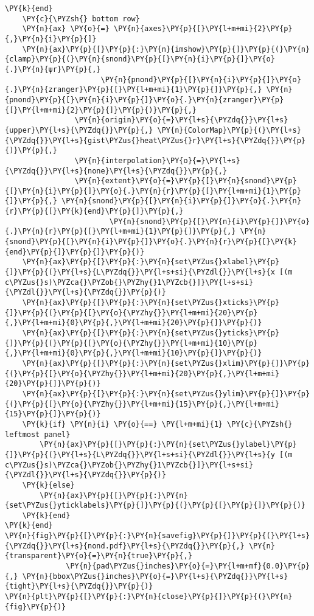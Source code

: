 \begin{Verbatim}[commandchars=\\\{\}]
    \PY{k}{end}
    \PY{c}{\PYZsh{} bottom row}
    \PY{n}{ax} \PY{o}{=} \PY{n}{axes}\PY{p}{[}\PY{l+m+mi}{2}\PY{p}{,}\PY{n}{i}\PY{p}{]}
    \PY{n}{ax}\PY{p}{[}\PY{p}{:}\PY{n}{imshow}\PY{p}{]}\PY{p}{(}\PY{n}{clamp}\PY{p}{(}\PY{n}{snond}\PY{p}{[}\PY{n}{i}\PY{p}{]}\PY{o}{.}\PY{n}{ψr}\PY{p}{,}
                      \PY{n}{pnond}\PY{p}{[}\PY{n}{i}\PY{p}{]}\PY{o}{.}\PY{n}{zranger}\PY{p}{[}\PY{l+m+mi}{1}\PY{p}{]}\PY{p}{,} \PY{n}{pnond}\PY{p}{[}\PY{n}{i}\PY{p}{]}\PY{o}{.}\PY{n}{zranger}\PY{p}{[}\PY{l+m+mi}{2}\PY{p}{]}\PY{p}{)}\PY{p}{,}
                \PY{n}{origin}\PY{o}{=}\PY{l+s}{\PYZdq{}}\PY{l+s}{upper}\PY{l+s}{\PYZdq{}}\PY{p}{,} \PY{n}{ColorMap}\PY{p}{(}\PY{l+s}{\PYZdq{}}\PY{l+s}{gist\PYZus{}heat\PYZus{}r}\PY{l+s}{\PYZdq{}}\PY{p}{)}\PY{p}{,}
                \PY{n}{interpolation}\PY{o}{=}\PY{l+s}{\PYZdq{}}\PY{l+s}{none}\PY{l+s}{\PYZdq{}}\PY{p}{,}
                \PY{n}{extent}\PY{o}{=}\PY{p}{[}\PY{n}{snond}\PY{p}{[}\PY{n}{i}\PY{p}{]}\PY{o}{.}\PY{n}{r}\PY{p}{[}\PY{l+m+mi}{1}\PY{p}{]}\PY{p}{,} \PY{n}{snond}\PY{p}{[}\PY{n}{i}\PY{p}{]}\PY{o}{.}\PY{n}{r}\PY{p}{[}\PY{k}{end}\PY{p}{]}\PY{p}{,}
                        \PY{n}{snond}\PY{p}{[}\PY{n}{i}\PY{p}{]}\PY{o}{.}\PY{n}{r}\PY{p}{[}\PY{l+m+mi}{1}\PY{p}{]}\PY{p}{,} \PY{n}{snond}\PY{p}{[}\PY{n}{i}\PY{p}{]}\PY{o}{.}\PY{n}{r}\PY{p}{[}\PY{k}{end}\PY{p}{]}\PY{p}{]}\PY{p}{)}
    \PY{n}{ax}\PY{p}{[}\PY{p}{:}\PY{n}{set\PYZus{}xlabel}\PY{p}{]}\PY{p}{(}\PY{l+s}{L\PYZdq{}}\PY{l+s+si}{\PYZdl{}}\PY{l+s}{x [(m c\PYZus{}s)\PYZca{}\PYZob{}\PYZhy{}1\PYZcb{}]}\PY{l+s+si}{\PYZdl{}}\PY{l+s}{\PYZdq{}}\PY{p}{)}
    \PY{n}{ax}\PY{p}{[}\PY{p}{:}\PY{n}{set\PYZus{}xticks}\PY{p}{]}\PY{p}{(}\PY{p}{[}\PY{o}{\PYZhy{}}\PY{l+m+mi}{20}\PY{p}{,}\PY{l+m+mi}{0}\PY{p}{,}\PY{l+m+mi}{20}\PY{p}{]}\PY{p}{)}
    \PY{n}{ax}\PY{p}{[}\PY{p}{:}\PY{n}{set\PYZus{}yticks}\PY{p}{]}\PY{p}{(}\PY{p}{[}\PY{o}{\PYZhy{}}\PY{l+m+mi}{10}\PY{p}{,}\PY{l+m+mi}{0}\PY{p}{,}\PY{l+m+mi}{10}\PY{p}{]}\PY{p}{)}
    \PY{n}{ax}\PY{p}{[}\PY{p}{:}\PY{n}{set\PYZus{}xlim}\PY{p}{]}\PY{p}{(}\PY{p}{[}\PY{o}{\PYZhy{}}\PY{l+m+mi}{20}\PY{p}{,}\PY{l+m+mi}{20}\PY{p}{]}\PY{p}{)}
    \PY{n}{ax}\PY{p}{[}\PY{p}{:}\PY{n}{set\PYZus{}ylim}\PY{p}{]}\PY{p}{(}\PY{p}{[}\PY{o}{\PYZhy{}}\PY{l+m+mi}{15}\PY{p}{,}\PY{l+m+mi}{15}\PY{p}{]}\PY{p}{)}
    \PY{k}{if} \PY{n}{i} \PY{o}{==} \PY{l+m+mi}{1} \PY{c}{\PYZsh{} leftmost panel}
        \PY{n}{ax}\PY{p}{[}\PY{p}{:}\PY{n}{set\PYZus{}ylabel}\PY{p}{]}\PY{p}{(}\PY{l+s}{L\PYZdq{}}\PY{l+s+si}{\PYZdl{}}\PY{l+s}{y [(m c\PYZus{}s)\PYZca{}\PYZob{}\PYZhy{}1\PYZcb{}]}\PY{l+s+si}{\PYZdl{}}\PY{l+s}{\PYZdq{}}\PY{p}{)}
    \PY{k}{else}
        \PY{n}{ax}\PY{p}{[}\PY{p}{:}\PY{n}{set\PYZus{}yticklabels}\PY{p}{]}\PY{p}{(}\PY{p}{[}\PY{p}{]}\PY{p}{)}
    \PY{k}{end}
\PY{k}{end}
\PY{n}{fig}\PY{p}{[}\PY{p}{:}\PY{n}{savefig}\PY{p}{]}\PY{p}{(}\PY{l+s}{\PYZdq{}}\PY{l+s}{nond.pdf}\PY{l+s}{\PYZdq{}}\PY{p}{,} \PY{n}{transparent}\PY{o}{=}\PY{n}{true}\PY{p}{,}
              \PY{n}{pad\PYZus{}inches}\PY{o}{=}\PY{l+m+mf}{0.0}\PY{p}{,} \PY{n}{bbox\PYZus{}inches}\PY{o}{=}\PY{l+s}{\PYZdq{}}\PY{l+s}{tight}\PY{l+s}{\PYZdq{}}\PY{p}{)}
\PY{n}{plt}\PY{p}{[}\PY{p}{:}\PY{n}{close}\PY{p}{]}\PY{p}{(}\PY{n}{fig}\PY{p}{)}
\end{Verbatim}
